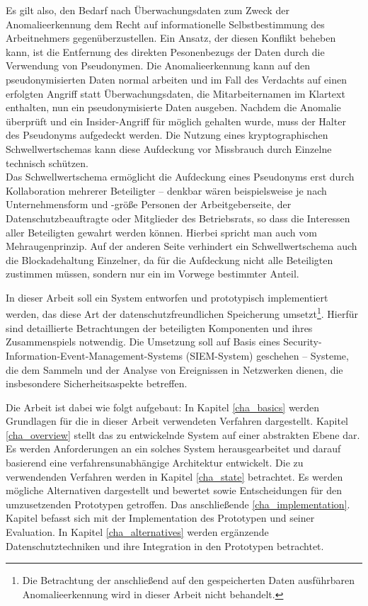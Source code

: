 Es gilt also, den Bedarf nach Überwachungsdaten zum Zweck der Anomalieerkennung dem Recht auf informationelle Selbstbestimmung des Arbeitnehmers gegenüberzustellen. 
Ein Ansatz, der diesen Konflikt beheben kann, ist die Entfernung des direkten Pesonenbezugs der Daten durch die Verwendung von Pseudonymen. Die Anomalieerkennung kann auf den pseudonymisierten Daten normal arbeiten und im Fall des Verdachts auf einen erfolgten Angriff statt Überwachungsdaten, die Mitarbeiternamen im Klartext enthalten, nun ein pseudonymisierte Daten ausgeben. %
Nachdem die Anomalie überprüft und ein Insider-Angriff für möglich gehalten wurde, muss der Halter des Pseudonyms aufgedeckt werden. Die Nutzung eines kryptographischen Schwellwertschemas kann diese Aufdeckung vor Missbrauch durch Einzelne technisch schützen.\\
Das Schwellwertschema ermöglicht die Aufdeckung eines Pseudonyms erst durch Kollaboration mehrerer Beteiligter -- denkbar wären beispielsweise je nach Unternehmensform und -größe Personen der Arbeitgeberseite, der Datenschutzbeauftragte oder Mitglieder des Betriebsrats, so dass die Interessen aller Beteiligten gewahrt werden können. Hierbei spricht man auch vom Mehraugenprinzip. Auf der anderen Seite verhindert ein Schwellwertschema auch die Blockadehaltung Einzelner, da für die Aufdeckung nicht alle Beteiligten zustimmen müssen, sondern nur ein im Vorwege bestimmter Anteil.

In dieser Arbeit soll ein System entworfen und prototypisch implementiert werden, das diese Art der datenschutzfreundlichen Speicherung umsetzt\footnote{
  Die Betrachtung der anschließend auf den gespeicherten Daten ausführbaren Anomalieerkennung wird in dieser Arbeit nicht behandelt. 
}. Hierfür sind detaillierte Betrachtungen der beteiligten Komponenten und ihres Zusammenspiels notwendig. Die Umsetzung soll auf Basis eines Security-Information-Event-Management-Systems (SIEM-System) geschehen -- Systeme, die dem Sammeln und der Analyse von Ereignissen in Netzwerken dienen, die insbesondere Sicherheitsaspekte betreffen.

Die Arbeit ist dabei wie folgt aufgebaut:
In Kapitel \ref{cha_basics} werden Grundlagen für die in dieser Arbeit verwendeten Verfahren dargestellt.  
Kapitel \ref{cha_overview} stellt das zu entwickelnde System auf einer abstrakten Ebene dar. Es werden Anforderungen an ein solches System herausgearbeitet und darauf basierend eine verfahrensunabhängige Architektur entwickelt.
Die zu verwendenden Verfahren werden in Kapitel \ref{cha_state} betrachtet. Es werden mögliche Alternativen dargestellt und bewertet sowie Entscheidungen für den umzusetzenden Prototypen getroffen.
Das anschließende \ref{cha_implementation}. Kapitel befasst sich mit der Implementation des Prototypen und seiner Evaluation. 
In Kapitel \ref{cha_alternatives} werden ergänzende Datenschutztechniken und ihre Integration in den Prototypen betrachtet.

